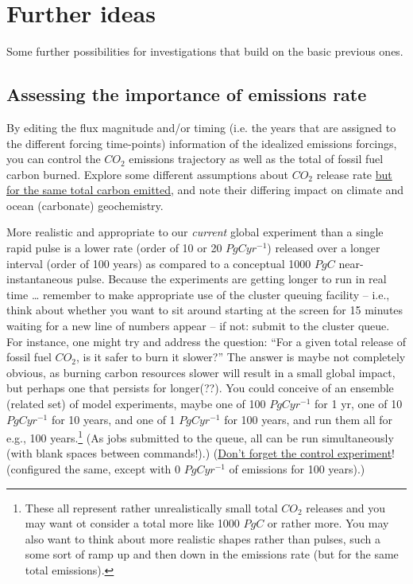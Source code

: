 \newpage

\section{Further ideas}

Some further possibilities for investigations that build on the basic previous ones. 


\subsection{Assessing the importance of emissions rate}

By editing the flux magnitude and/or timing (i.e. the years that are assigned to the different forcing time-points) information of the idealized emissions forcings, you can control the \(CO_{2}\) emissions trajectory as well as the total of fossil fuel carbon burned. Explore some different assumptions about \(CO_{2}\) release rate \uline{but for the same total carbon emitted}, and note their differing impact on climate and ocean (carbonate) geochemistry.

\vspace{1mm}

More realistic and appropriate to our \textit{current} global experiment than a single rapid pulse is a lower rate (order of 10 or 20 \(PgCyr^{-1}\)) released over a longer interval (order of 100 years) as compared to a conceptual 1000 \(PgC\) near-instantaneous pulse. Because the experiments are getting longer to run in real time … remember to make appropriate use of the cluster queuing facility – i.e., think about whether you want to sit around starting at the screen for 15 minutes waiting for a new line of numbers appear – if not: submit to the cluster queue. For instance, one might try and address the question: “For a given total release of  fossil fuel \(CO_{2}\), is it safer to burn it slower?” The answer is maybe not completely obvious, as burning carbon resources slower will result in a small global impact, but perhaps one that persists for longer(??). You could conceive of an ensemble (related set) of model experiments, maybe one of 100 \(PgCyr^{-1}\) for 1 yr, one of 10 \(PgCyr^{-1}\) for 10 years, and one of 1 \(PgCyr^{-1}\) for 100 years, and run them all for e.g., 100 years.\footnote{These all represent rather unrealistically small total \(CO_{2}\) releases and you may want ot consider a total more like 1000 \(PgC\) or rather more. You may also want to think about more realistic shapes rather than pulses, such a some sort of ramp up and then down in the emissions rate (but for the same total emissions).} (As jobs submitted to the queue, all can be run simultaneously (with blank spaces between commands!).) (\uline{Don’t forget the control experiment}! (configured the same, except with 0 \(PgCyr^{-1}\) of emissions for 100 years).)

